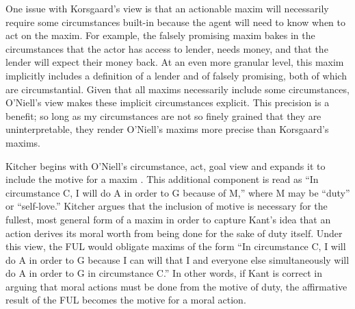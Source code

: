 \begin{isabellebody}
\begin{isamarkuptext}
One issue with Korsgaard's view is that an actionable maxim will necessarily
require some circumstances built-in because the agent will need to know when to act on the maxim. For example,
the falsely promising maxim bakes in the circumstances that the actor has access to lender, needs money, 
and that the lender will expect their money back. At an even more granular level, this maxim implicitly includes
a definition of a lender and of falsely promising, both of which are circumstantial. Given that all
maxims necessarily include some circumstances, O'Niell's view makes these implicit circumstances
explicit. This precision is a benefit; so long as my circumstances are not so finely grained that they
are uninterpretable, they render O'Niell's maxims more precise than Korsgaard's maxims.%
\end{isamarkuptext}\isamarkuptrue%
%
\isadelimdocument
%
\endisadelimdocument
%
\isatagdocument
%
\isamarkuptrue%
%
\endisatagdocument
{\isafolddocument}%
%
\isadelimdocument
%
\endisadelimdocument
%
\begin{isamarkuptext}%
Kitcher begins with O'Niell's 
circumstance, act, goal view and expands it to include the motive for a maxim \citep{whatisamaxim}. 
This additional component is read as ``In circumstance C, I will do A in order to G because of M,'' 
where M may be ``duty'' or ``self-love.'' Kitcher argues that the inclusion of motive is necessary 
for the fullest, most general form of a maxim in order to capture Kant's idea that an action derives 
its moral worth from being done for the sake of duty itself. Under this view, the FUL would obligate maxims of the form 
``In circumstance C, I will do A in order to G because I can will that I and everyone else simultaneously
will do A in order to G in circumstance C.'' In other words, if Kant is correct in arguing that moral 
actions must be done from the motive of duty, the affirmative result of the FUL becomes 
the motive for a moral action.


\end{isamarkuptext}
\end{isabellebody}
